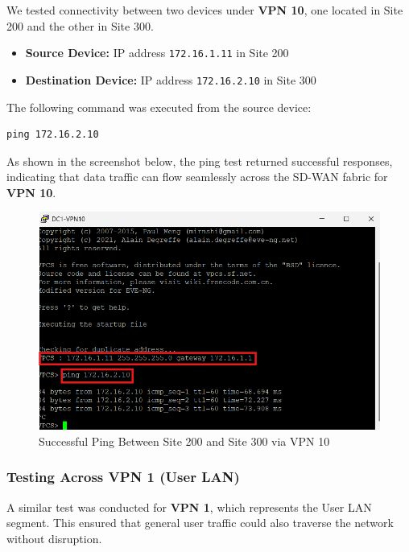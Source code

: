 \documentclass[12pt,english]{report}
\begin{document}
We tested connectivity between two devices under \textbf{VPN 10}, one located in Site 200 and the other in Site 300.

\begin{itemize}
    \item \textbf{Source Device:} IP address \texttt{172.16.1.11} in Site 200
    \item \textbf{Destination Device:} IP address \texttt{172.16.2.10} in Site 300
\end{itemize}

The following command was executed from the source device:

\begin{verbatim}
ping 172.16.2.10
\end{verbatim}

As shown in the screenshot below, the ping test returned successful responses, indicating that data traffic can flow seamlessly across the SD-WAN fabric for \textbf{VPN 10}.

\begin{figure}[H]
    \centering
    \includegraphics[width=1\linewidth]{chapter 4/end-conn-vpn10.png}
    \caption{Successful Ping Between Site 200 and Site 300 via VPN 10}
    \label{fig:end_to_end_vpn10}
\end{figure}

\subsubsection{Testing Across VPN 1 (User LAN)}

A similar test was conducted for \textbf{VPN 1}, which represents the User LAN segment. This ensured that general user traffic could also traverse the network without disruption.
\end{document}
